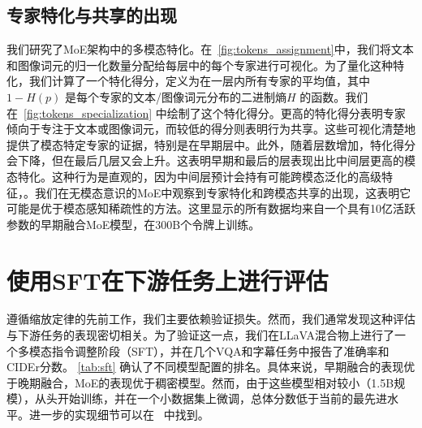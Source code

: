 \subsection{专家特化与共享的出现}
\label{sec:specialization}
我们研究了MoE架构中的多模态特化。在~\cref{fig:tokens_assignment}中，我们将文本和图像词元的归一化数量分配给每层中的每个专家进行可视化。为了量化这种特化，我们计算了一个特化得分，定义为在一层内所有专家的平均值，其中$1-H(p)$ 是每个专家的文本/图像词元分布的二进制熵$H$ 的函数。我们在~\cref{fig:tokens_specialization} 中绘制了这个特化得分。更高的特化得分表明专家倾向于专注于文本或图像词元，而较低的得分则表明行为共享。这些可视化清楚地提供了模态特定专家的证据，特别是在早期层中。此外，随着层数增加，特化得分会下降，但在最后几层又会上升。这表明早期和最后的层表现出比中间层更高的模态特化。这种行为是直观的，因为中间层预计会持有可能跨模态泛化的高级特征，。我们在无模态意识的MoE中观察到专家特化和跨模态共享的出现，这表明它可能是优于模态感知稀疏性的方法。这里显示的所有数据均来自一个具有10亿活跃参数的早期融合MoE模型，在300B个令牌上训练。 







\vspace{-1cm}
\section{使用SFT在下游任务上进行评估} 
遵循缩放定律的先前工作，我们主要依赖验证损失。然而，我们通常发现这种评估与下游任务的表现密切相关。为了验证这一点，我们在LLaVA混合物上进行了一个多模态指令调整阶段（SFT）\citep{liu2024improvedllava}，并在几个VQA和字幕任务中报告了准确率和CIDEr分数。
\cref{tab:sft} 确认了不同模型配置的排名。具体来说，早期融合的表现优于晚期融合，MoE的表现优于稠密模型。然而，由于这些模型相对较小（1.5B规模），从头开始训练，并在一个小数据集上微调，总体分数低于当前的最先进水平。进一步的实现细节可以在~ 中找到。  


\begin{figure}[t!]
    \begin{minipage}[t]{0.58\textwidth}
        
    \end{minipage}
    \hfill
    \begin{minipage}[t]{0.38\textwidth}
        
    \end{minipage}
    \vspace{3mm}
\end{figure}

